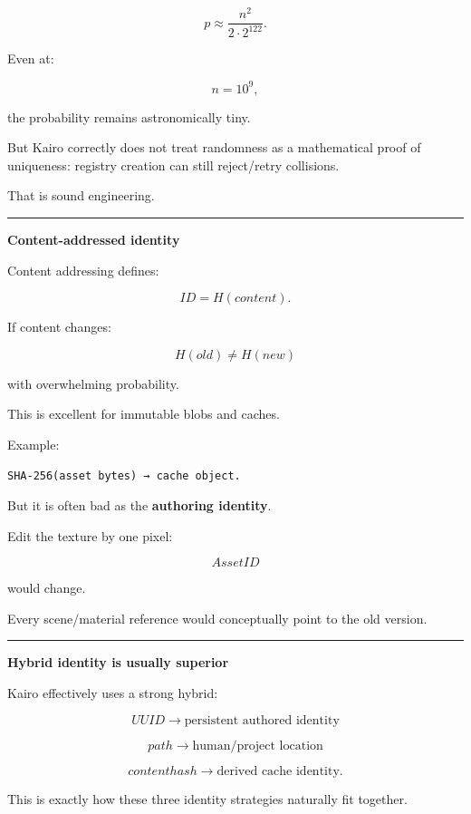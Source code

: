 \[
p\approx
\frac{n^2}{2\cdot2^{122}}.
\]

Even at:

\[
n=10^9,
\]

the probability remains astronomically tiny.

But Kairo correctly does not treat randomness as a mathematical proof of uniqueness: registry creation can still reject/retry collisions.

That is sound engineering.

\begin{center}\rule{0.5\linewidth}{0.5pt}\end{center}

\textbf{Content-addressed identity}

Content addressing defines:

\[
ID=H(content).
\]

If content changes:

\[
H(old)\neq H(new)
\]

with overwhelming probability.

This is excellent for immutable blobs and caches.

Example:

\begin{verbatim}
SHA-256(asset bytes) → cache object.
\end{verbatim}

But it is often bad as the \textbf{authoring identity}.

Edit the texture by one pixel:

\[
AssetID
\]

would change.

Every scene/material reference would conceptually point to the old version.

\begin{center}\rule{0.5\linewidth}{0.5pt}\end{center}

\textbf{Hybrid identity is usually superior}

Kairo effectively uses a strong hybrid:

\[
\boxed{
UUID
\rightarrow
\text{persistent authored identity}
}
\]

\[
\boxed{
path
\rightarrow
\text{human/project location}
}
\]

\[
\boxed{
content hash
\rightarrow
\text{derived cache identity}.
}
\]

This is exactly how these three identity strategies naturally fit together.


